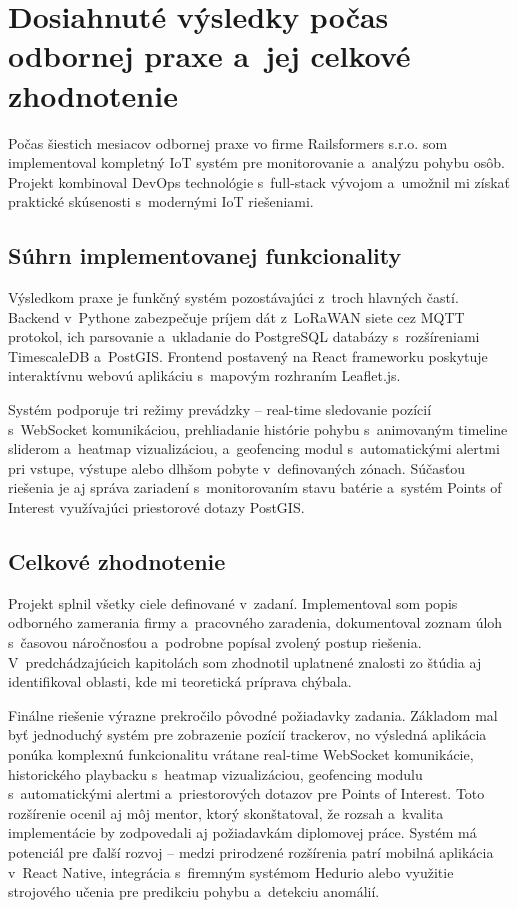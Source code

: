 \chapter{Dosiahnuté výsledky počas odbornej praxe a~jej celkové zhodnotenie}
\label{sec:Vysledky}

Počas šiestich mesiacov odbornej praxe vo firme Railsformers s.r.o. som implementoval kompletný IoT systém pre monitorovanie a~analýzu pohybu osôb. Projekt kombinoval DevOps technológie s~full-stack vývojom a~umožnil mi získať praktické skúsenosti s~modernými IoT riešeniami.

\section{Súhrn implementovanej funkcionality}
\label{sec:SuhrnFunkcionality}

Výsledkom praxe je funkčný systém pozostávajúci z~troch hlavných častí. Backend v~Pythone zabezpečuje príjem dát z~LoRaWAN siete cez MQTT protokol, ich parsovanie a~ukladanie do PostgreSQL databázy s~rozšíreniami TimescaleDB a~PostGIS. Frontend postavený na React frameworku poskytuje interaktívnu webovú aplikáciu s~mapovým rozhraním Leaflet.js.

Systém podporuje tri režimy prevádzky -- real-time sledovanie pozícií s~WebSocket komunikáciou, prehliadanie histórie pohybu s~animovaným timeline sliderom a~heatmap vizualizáciou, a~geofencing modul s~automatickými alertmi pri vstupe, výstupe alebo dlhšom pobyte v~definovaných zónach. Súčasťou riešenia je aj správa zariadení s~monitorovaním stavu batérie a~systém Points of Interest využívajúci priestorové dotazy PostGIS.

\section{Celkové zhodnotenie}
\label{sec:CelkoveZhodnotenie}

Projekt splnil všetky ciele definované v~zadaní. Implementoval som popis odborného zamerania firmy a~pracovného zaradenia, dokumentoval zoznam úloh s~časovou náročnosťou a~podrobne popísal zvolený postup riešenia. V~predchádzajúcich kapitolách som zhodnotil uplatnené znalosti zo štúdia aj identifikoval oblasti, kde mi teoretická príprava chýbala.

Finálne riešenie výrazne prekročilo pôvodné požiadavky zadania. Základom mal byť jednoduchý systém pre zobrazenie pozícií trackerov, no výsledná aplikácia ponúka komplexnú funkcionalitu vrátane real-time WebSocket komunikácie, historického playbacku s~heatmap vizualizáciou, geofencing modulu s~automatickými alertmi a~priestorových dotazov pre Points of Interest. Toto rozšírenie ocenil aj môj mentor, ktorý skonštatoval, že rozsah a~kvalita implementácie by zodpovedali aj požiadavkám diplomovej práce. Systém má potenciál pre ďalší rozvoj -- medzi prirodzené rozšírenia patrí mobilná aplikácia v~React Native, integrácia s~firemným systémom Hedurio alebo využitie strojového učenia pre predikciu pohybu a~detekciu anomálií.

